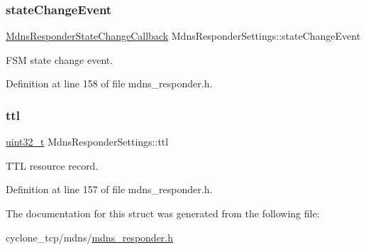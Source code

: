 \mbox{\label{structMdnsResponderSettings_a37f9ce82f094fb92d3c7372c02b03bb7}} 
\subsubsection{\texorpdfstring{state\+Change\+Event}{stateChangeEvent}}
{\footnotesize\ttfamily \hyperlink{mdns__responder_8h_a1f5892c829ec9bb9fc3442afdc64a92e}{Mdns\+Responder\+State\+Change\+Callback} Mdns\+Responder\+Settings\+::state\+Change\+Event}



F\+SM state change event. 



Definition at line 158 of file mdns\+\_\+responder.\+h.

\mbox{\label{structMdnsResponderSettings_a41f33d42f7fe7bd59d99628b64f4f81a}} 
\subsubsection{\texorpdfstring{ttl}{ttl}}
{\footnotesize\ttfamily \hyperlink{stdint_8h_a435d1572bf3f880d55459d9805097f62}{uint32\+\_\+t} Mdns\+Responder\+Settings\+::ttl}



T\+TL resource record. 



Definition at line 157 of file mdns\+\_\+responder.\+h.



The documentation for this struct was generated from the following file\+:\begin{DoxyCompactItemize}
\item 
cyclone\+\_\+tcp/mdns/\hyperlink{mdns__responder_8h}{mdns\+\_\+responder.\+h}\end{DoxyCompactItemize}
